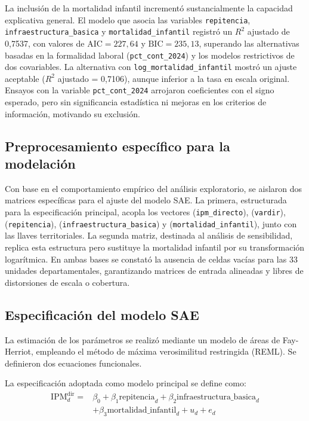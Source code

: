 La inclusión de la mortalidad infantil incrementó sustancialmente la capacidad explicativa general. El modelo que asocia las variables \texttt{repitencia}, \texttt{infraestructura\_basica} y \texttt{mortalidad\_infantil} registró un $R^2$ ajustado de 0,7537, con valores de $\text{AIC} = 227,64$ y $\text{BIC} = 235,13$, superando las alternativas basadas en la formalidad laboral (\texttt{pct\_cont\_2024}) y los modelos restrictivos de dos covariables. La alternativa con \texttt{log\_mortalidad\_infantil} mostró un ajuste aceptable ($R^2$ ajustado = 0,7106), aunque inferior a la tasa en escala original. Ensayos con la variable \texttt{pct\_cont\_2024} arrojaron coeficientes con el signo esperado, pero sin significancia estadística ni mejoras en los criterios de información, motivando su exclusión.

\subsection{Preprocesamiento específico para la modelación}
Con base en el comportamiento empírico del análisis exploratorio, se aislaron dos matrices específicas para el ajuste del modelo SAE. La primera, estructurada para la especificación principal, acopla los vectores (\texttt{ipm\_directo}), (\texttt{vardir}), (\texttt{repitencia}), (\texttt{infraestructura\_basica}) y (\texttt{mortalidad\_infantil}), junto con las llaves territoriales. La segunda matriz, destinada al análisis de sensibilidad, replica esta estructura pero sustituye la mortalidad infantil por su transformación logarítmica. En ambas bases se constató la ausencia de celdas vacías para las 33 unidades departamentales, garantizando matrices de entrada alineadas y libres de distorsiones de escala o cobertura.

\subsection{Especificación del modelo SAE}
La estimación de los parámetros se realizó mediante un modelo de áreas de Fay-Herriot, empleando el método de máxima verosimilitud restringida (REML). Se definieron dos ecuaciones funcionales.

La especificación adoptada como modelo principal se define como:
\begin{equation}
    \begin{split}        
        \text{IPM}_d^{\text{dir}} = {} & \beta_0 + \beta_1 \text{repitencia}_d + \beta_2 \text{infraestructura\_basica}_d \\ 
        & + \beta_3 \text{mortalidad\_infantil}_d + u_d + e_d
    \end{split}
\end{equation}

